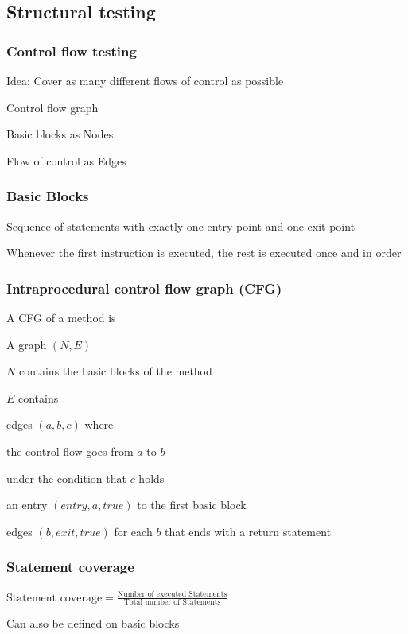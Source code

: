 \subsection{Structural testing}

\subsubsection{Control flow testing}
\enumstart
	\item Idea: Cover as many different flows of control as possible
	\item Control flow graph
	\enumstart
		\item Basic blocks as Nodes
		\item Flow of control as Edges
	\enumend
\enumend

\subsubsection{Basic Blocks}
\enumstart
	\item Sequence of statements with exactly one entry-point and one exit-point
	\item Whenever the first instruction is executed, the rest is executed once and in order
\enumend

\subsubsection{Intraprocedural control flow graph (CFG)}
\enumstart
	\item A CFG of a method is
	\enumstart
		\item A graph $(N, E)$
		\item $N$ contains the basic blocks of the method
		\item $E$ contains
		\enumstart
			\item edges $(a, b, c)$ where
			\enumstart
				\item the control flow goes from $a$ to $b$
				\item under the condition that $c$ holds
			\enumend
			\item an entry $(entry, a, true)$ to the first basic block
			\item edges $(b, exit, true)$ for each $b$ that ends with a return statement
		\enumend
	\enumend
\enumend

\subsubsection{Statement coverage}
\enumstart
	\item $\text{Statement coverage} = \frac{\text{Number of executed Statements}}{\text{Total number of Statements}}$
	\item Can also be defined on basic blocks
\enumend

